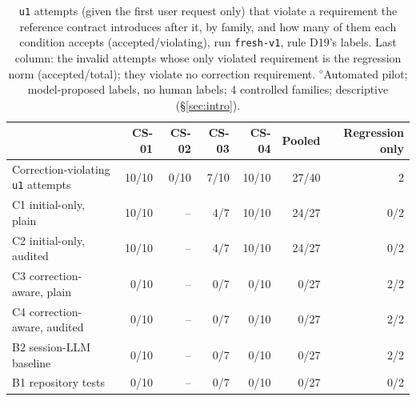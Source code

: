 \begin{table}[t]\centering\footnotesize
\caption{\texttt{u1} attempts (given the first user request only) that violate a requirement the reference contract introduces after it, by family, and how many of them each condition accepts (accepted/violating), run \texttt{fresh-v1}, rule D19's labels. Last column: the invalid attempts whose only violated requirement is the regression norm (accepted/total); they violate no correction requirement. $^{\diamond}$Automated pilot; model-proposed labels, no human labels; 4 controlled families; descriptive (\S\ref{sec:intro}).}\label{tab:fresh-cv}
\begin{tabular}{lrrrrrr}\toprule  & CS-01 & CS-02 & CS-03 & CS-04 & Pooled & Regression only \\\midrule
Correction-violating \texttt{u1} attempts & 10/10 & 0/10 & 7/10 & 10/10 & 27/40 & 2 \\\midrule
C1 initial-only, plain & 10/10 & -- & 4/7 & 10/10 & 24/27 & 0/2 \\
C2 initial-only, audited & 10/10 & -- & 4/7 & 10/10 & 24/27 & 0/2 \\
C3 correction-aware, plain & 0/10 & -- & 0/7 & 0/10 & 0/27 & 2/2 \\
C4 correction-aware, audited & 0/10 & -- & 0/7 & 0/10 & 0/27 & 2/2 \\
B2 session-LLM baseline & 0/10 & -- & 0/7 & 0/10 & 0/27 & 2/2 \\
B1 repository tests & 0/10 & -- & 0/7 & 0/10 & 0/27 & 0/2 \\
\bottomrule\end{tabular}\end{table}
